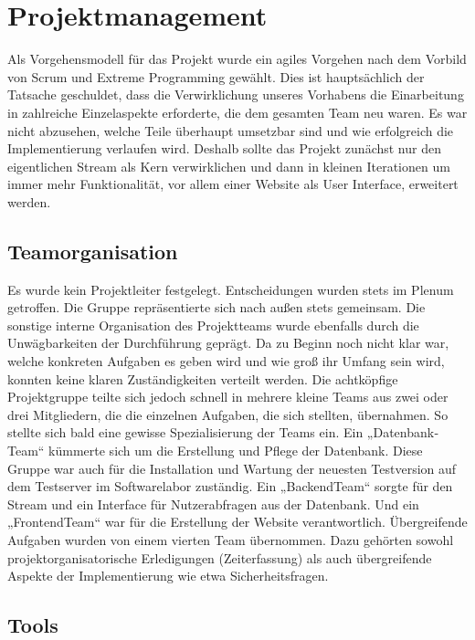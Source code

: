 \chapter{Projektmanagement}

Als Vorgehensmodell für das Projekt wurde ein agiles Vorgehen nach dem Vorbild von Scrum und
Extreme Programming gewählt. Dies ist hauptsächlich der Tatsache geschuldet, dass die
Verwirklichung unseres Vorhabens die Einarbeitung in zahlreiche Einzelaspekte erforderte, die
dem gesamten Team neu waren. Es war nicht abzusehen, welche Teile überhaupt umsetzbar sind
und wie erfolgreich die Implementierung verlaufen wird. Deshalb sollte das Projekt zunächst nur
den eigentlichen Stream als Kern verwirklichen und dann in kleinen Iterationen um immer mehr
Funktionalität, vor allem einer Website als User Interface, erweitert werden.

\section{Teamorganisation}
Es wurde kein Projektleiter festgelegt. Entscheidungen wurden stets im Plenum getroffen. Die
Gruppe repräsentierte sich nach außen stets gemeinsam.
Die sonstige interne Organisation des Projektteams wurde ebenfalls durch die Unwägbarkeiten der
Durchführung geprägt. Da zu Beginn noch nicht klar war, welche konkreten Aufgaben es geben
wird und wie groß ihr Umfang sein wird, konnten keine klaren Zuständigkeiten verteilt werden.
Die achtköpfige Projektgruppe teilte sich jedoch schnell in mehrere kleine Teams aus zwei oder
drei Mitgliedern, die die einzelnen Aufgaben, die sich stellten, übernahmen. So stellte sich bald
eine gewisse Spezialisierung der Teams ein. Ein „Datenbank­Team“ kümmerte sich um die
Erstellung und Pflege der Datenbank. Diese Gruppe war auch für die Installation und Wartung der
neuesten Testversion auf dem Testserver im Softwarelabor zuständig. Ein „Backend­Team“ sorgte
für den Stream und ein Interface für Nutzerabfragen aus der Datenbank. Und ein „Frontend­Team“
war für die Erstellung der Website verantwortlich. Übergreifende Aufgaben wurden von einem
vierten Team übernommen. Dazu gehörten sowohl projektorganisatorische Erledigungen
(Zeiterfassung) als auch übergreifende Aspekte der Implementierung wie etwa Sicherheitsfragen.

\section{Tools}

